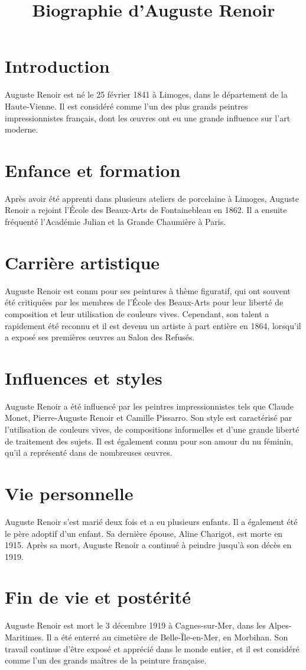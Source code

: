 \documentclass[12pt, a4paper]{article}
\title{Biographie d'Auguste Renoir}
\author{}
\date{}
\begin{document}
   \maketitle
   \section*{Introduction}
   \noindent
   Auguste Renoir est né le 25 février 1841 à Limoges, dans le département de la Haute-Vienne. Il est considéré comme l'un des plus grands peintres impressionnistes français, dont les œuvres ont eu une grande influence sur l'art moderne.
   \section*{Enfance et formation}
   \noindent
   Après avoir été apprenti dans plusieurs ateliers de porcelaine à Limoges, Auguste Renoir a rejoint l'École des Beaux-Arts de Fontainebleau en 1862. Il a ensuite fréquenté l'Académie Julian et la Grande Chaumière à Paris.
   \section*{Carrière artistique}
   \noindent
   Auguste Renoir est connu pour ses peintures à thème figuratif, qui ont souvent été critiquées par les membres de l'École des Beaux-Arts pour leur liberté de composition et leur utilisation de couleurs vives. Cependant, son talent a rapidement été reconnu et il est devenu un artiste à part entière en 1864, lorsqu'il a exposé ses premières œuvres au Salon des Refusés.
   \section*{Influences et styles}
   \noindent
   Auguste Renoir a été influencé par les peintres impressionnistes tels que Claude Monet, Pierre-Auguste Renoir et Camille Pissarro. Son style est caractérisé par l'utilisation de couleurs vives, de compositions informelles et d'une grande liberté de traitement des sujets. Il est également connu pour son amour du nu féminin, qu'il a représenté dans de nombreuses œuvres.
   \section*{Vie personnelle}
   \noindent
   Auguste Renoir s'est marié deux fois et a eu plusieurs enfants. Il a également été le père adoptif d'un enfant. Sa dernière épouse, Aline Charigot, est morte en 1915. Après sa mort, Auguste Renoir a continué à peindre jusqu'à son décès en 1919.
   \section*{Fin de vie et postérité}
   \noindent
   Auguste Renoir est mort le 3 décembre 1919 à Cagnes-sur-Mer, dans les Alpes-Maritimes. Il a été enterré au cimetière de Belle-Île-en-Mer, en Morbihan. Son travail continue d'être exposé et apprécié dans le monde entier, et il est considéré comme l'un des grands maîtres de la peinture française.

   
\end{document}
